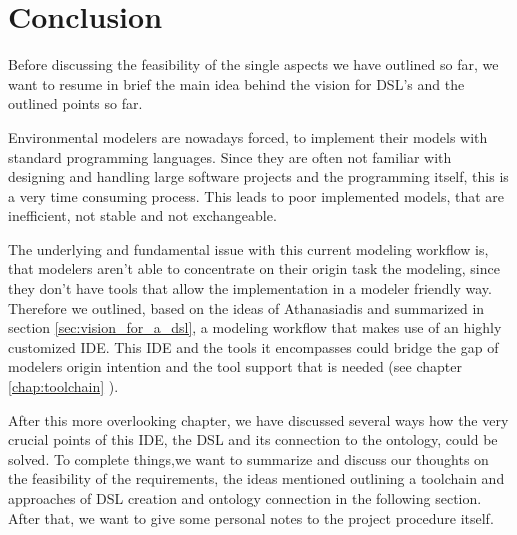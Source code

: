 \chapter{Conclusion}
\par
Before discussing the feasibility of the single aspects we have outlined so far, we want to resume in brief the main idea behind the vision for DSL’s and the outlined points so far.
\par
Environmental modelers are nowadays forced, to implement their models with standard programming languages. Since they are often not familiar with designing and handling large software projects and the programming itself, this is a very time consuming process. This leads to poor implemented models, that are inefficient, not stable and not exchangeable.
\par
The underlying and fundamental issue with this current modeling workflow is, that modelers aren’t able to concentrate on their origin task the modeling, since they don't have tools that allow the implementation in a modeler friendly way. Therefore we outlined, based on the ideas of Athanasiadis and summarized in section \ref{sec:vision_for_a_dsl}, a modeling workflow that makes use of an highly customized IDE. This IDE and the tools it encompasses could bridge the gap of modelers origin intention and the tool support that is needed (see chapter \ref{chap:toolchain} ).
\par
After this more overlooking chapter, we have discussed several ways how the very crucial points of this IDE, the DSL and its connection to the ontology, could be solved. To complete things,we want to summarize and discuss our thoughts on the feasibility of the requirements, the ideas mentioned outlining a toolchain and approaches of DSL creation and ontology connection in the following section. After that, we want to give some personal notes to the project procedure itself. 

